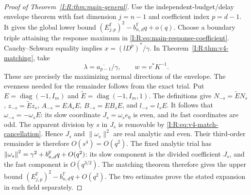 \begin{proof}[Proof of Theorem~\ref{I:R:thm:main-general}]
Use the independent-budget/delay envelope theorem with fast dimension
$j=n-1$ and coefficient index $p=d-1$. It gives the global lower bound
$(E_{j,p}^{\mathbb F})^2-b_{n,d}^{\mathbb F}q+o(q)$.
Choose a boundary triple attaining the response maximum in
\eqref{I:R:eq:main-response-coefficient}. Cauchy--Schwarz equality implies
$x=(lD^p)^*/\gamma$. In Theorem~\ref{I:R:thm:v4-matching}, take
\[
 \lambda=\overline{a_{p-1}}/\gamma,\qquad w=v^*K^{-1}.
\]
These are precisely the maximizing normal directions of the envelope.
The evenness needed for the remainder follows from the exact trial.
Put $E=\operatorname{diag}(-1,I_m)$ and
$\widetilde E=\operatorname{diag}(-1,I_m,1)$. The definitions give
$N_{-s}=\widetilde E N_s$, $z_{-s}=\widetilde E z_s$,
$A_{-s}=EA_sE$, $B_{-s}=EB_sE$, and $l_{-s}=l_sE$.
It follows that $\omega_{-s}=-\omega_sE$: its slow coordinate
$J_s=\omega_se_0$ is even, and its fast coordinates are odd.
The apparent division by $s$ in $J_s$ is removable by
\eqref{I:R:eq:v4-match-cancellation}. Hence $J_s$ and
$\|\omega_s\|^2$ are real analytic and even. Their third-order
remainder is therefore $O(s^4)=O(q^2)$.
The fixed analytic trial has
$\left\lVert\omega_s\right\rVert^2=\gamma^2+b_{n,d}^{\mathbb F}q+O(q^2)$:
its slow component is the divided coefficient $J_s$, and the fast
component is $O(q^{3/2})$. The matching theorem therefore gives the
upper bound $(E_{j,p}^{\mathbb F})^2-b_{n,d}^{\mathbb F}q+O(q^2)$.
The two estimates prove the stated expansion in each field separately.
\end{proof}
